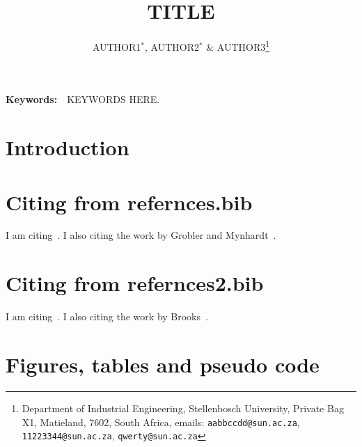 \documentclass[10pt]{article}
\title{TITLE}
\author{AUTHOR1$^*$, AUTHOR2$^*$ \& AUTHOR3\thanks{Department of Industrial Engineering, Stellenbosch University, Private Bag X1, Matieland, 7602, South Africa, emails: {\tt aabbccdd@sun.ac.za}, {\tt 11223344@sun.ac.za}, {\tt qwerty@sun.ac.za}}}
\begin{document}
\setcounter{page}{1}

\maketitle

\begin{abstract}

\blindtext

\end{abstract}

{\bf Keywords:}\ \ KEYWORDS HERE.


\pagestyle{myheadings}


\section{Introduction}

\Blindtext

\section{Citing from refernces.bib}

I am citing~\cite{finite}. I also citing the work by Grobler and Mynhardt~\cite{critical}.

\section{Citing from refernces2.bib}

I am citing~\cite{BrighamRCDuttonRP1990}. I also citing the work by Brooks~\cite{BrooksRL1941}.


%
%

\section{Figures, tables and pseudo code}








\appto\bibfont{\footnotesize}
  \printbibliography
\end{document}
